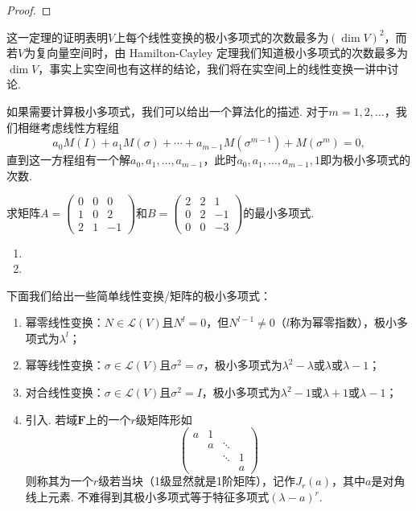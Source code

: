 \begin{proof}

\end{proof}

这一定理的证明表明$V$上每个线性变换的极小多项式的次数最多为$(\dim V)^2$，而若$V$为复向量空间时，由 Hamilton-Cayley 定理我们知道极小多项式的次数最多为$\dim V$，事实上实空间也有这样的结论，我们将在实空间上的线性变换一讲中讨论.

如果需要计算极小多项式，我们可以给出一个算法化的描述. 对于$m=1,2,\ldots$，我们相继考虑线性方程组
\[a_0M(I)+a_1M(\sigma)+\cdots+a_{m-1}M(\sigma^{m-1})+M(\sigma^m)=0,\]
直到这一方程组有一个解$a_0,a_1,\ldots,a_{m-1}$，此时$a_0,a_1,\ldots,a_{m-1},1$即为极小多项式的次数.
\begin{example} \label{ex:21:最小多项式}
    求矩阵$A=\begin{pmatrix}
            0 & 0 & 0 \\ 1 & 0 & 2 \\ 2 & 1 & -1
        \end{pmatrix}$和$B=\begin{pmatrix}
            2 & 2 & 1 \\ 0 & 2 & -1 \\ 0 & 0 & -3
        \end{pmatrix}$的最小多项式.
\end{example}

\begin{solution}
    \begin{enumerate}
        \item

        \item
    \end{enumerate}
\end{solution}

下面我们给出一些简单线性变换/矩阵的极小多项式：
\begin{enumerate}
    \item 幂零线性变换：$N\in \mathcal{L}(V)$且$N^l=0$，但$N^{l-1}\neq 0$（$l$称为幂零指数），极小多项式为$\lambda^l$；

    \item 幂等线性变换：$\sigma\in \mathcal{L}(V)$且$\sigma^2=\sigma$，极小多项式为$\lambda^2-\lambda$或$\lambda$或$\lambda-1$；

    \item 对合线性变换：$\sigma\in \mathcal{L}(V)$且$\sigma^2=I$，极小多项式为$\lambda^2-1$或$\lambda+1$或$\lambda-1$；

    \item 引入. 若域$\mathbf{F}$上的一个$r$级矩阵形如\[\begin{pmatrix}
                  a & 1 &        &   \\
                    & a & \ddots &   \\
                    &   & \ddots & 1 \\
                    &   &        & a
              \end{pmatrix}\]
          则称其为一个$r$级若当块（1级显然就是1阶矩阵），记作$J_r(a)$，其中$a$是对角线上元素. 不难得到其极小多项式等于特征多项式$(\lambda-a)^r$.
\end{enumerate}

